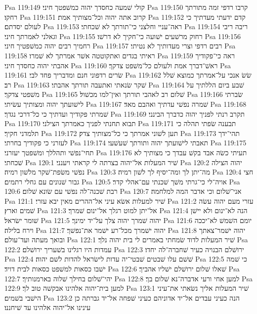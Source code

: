 Psa 119:149  קולי שׁמעה כחסדך יהוה כמשׁפטך חיני׃
Psa 119:150  קרבו רדפי זמה מתורתך רחקו׃
Psa 119:151  קרוב אתה יהוה וכל־מצותיך אמת׃
Psa 119:152  קדם ידעתי מעדתיך כי לעולם יסדתם׃
Psa 119:153  ראה־עניי וחלצני כי־תורתך לא שׁכחתי׃
Psa 119:154  ריבה ריבי וגאלני לאמרתך חיני׃
Psa 119:155  רחוק מרשׁעים ישׁועה כי־חקיך לא דרשׁו׃
Psa 119:156  רחמיך רבים יהוה כמשׁפטיך חיני׃
Psa 119:157  רבים רדפי וצרי מעדותיך לא נטיתי׃
Psa 119:158  ראיתי בגדים ואתקוטטה אשׁר אמרתך לא שׁמרו׃
Psa 119:159  ראה כי־פקודיך אהבתי יהוה כחסדך חיני׃
Psa 119:160  ראשׁ־דברך אמת ולעולם כל־משׁפט צדקך׃
Psa 119:161  שׂרים רדפוני חנם ומדבריך פחד לבי׃
Psa 119:162  שׂשׂ אנכי על־אמרתך כמוצא שׁלל רב׃
Psa 119:163  שׁקר שׂנאתי ואתעבה תורתך אהבתי׃
Psa 119:164  שׁבע ביום הללתיך על משׁפטי צדקך׃
Psa 119:165  שׁלום רב לאהבי תורתך ואין־למו מכשׁול׃
Psa 119:166  שׂברתי לישׁועתך יהוה ומצותיך עשׂיתי׃
Psa 119:167  שׁמרה נפשׁי עדתיך ואהבם מאד׃
Psa 119:168  שׁמרתי פקודיך ועדתיך כי כל־דרכי נגדך׃
Psa 119:169  תקרב רנתי לפניך יהוה כדברך הבינני׃
Psa 119:170  תבוא תחנתי לפניך כאמרתך הצילני׃
Psa 119:171  תבענה שׂפתי תהלה כי תלמדני חקיך׃
Psa 119:172  תען לשׁוני אמרתך כי כל־מצותיך צדק׃
Psa 119:173  תהי־ידך לעזרני כי פקודיך בחרתי׃
Psa 119:174  תאבתי לישׁועתך יהוה ותורתך שׁעשׁעי׃
Psa 119:175  תחי־נפשׁי ותהללך ומשׁפטך יעזרני׃
Psa 119:176  תעיתי כשׂה אבד בקשׁ עבדך כי מצותיך לא שׁכחתי׃
Psa 120:1  שׁיר המעלות אל־יהוה בצרתה לי קראתי ויענני׃
Psa 120:2  יהוה הצילה נפשׁי משׂפת־שׁקר מלשׁון רמיה׃
Psa 120:3  מה־יתן לך ומה־יסיף לך לשׁון רמיה׃
Psa 120:4  חצי גבור שׁנונים עם גחלי רתמים׃
Psa 120:5  אויה־לי כי־גרתי משׁך שׁכנתי עם־אהלי קדר׃
Psa 120:6  רבת שׁכנה־לה נפשׁי עם שׂונא שׁלום׃
Psa 120:7  אני־שׁלום וכי אדבר המה למלחמה׃
Psa 121:1  שׁיר למעלות אשׂא עיני אל־ההרים מאין יבא עזרי׃
Psa 121:2  עזרי מעם יהוה עשׂה שׁמים וארץ׃
Psa 121:3  אל־יתן למוט רגלך אל־ינום שׁמרך׃
Psa 121:4  הנה לא־ינום ולא יישׁן שׁומר ישׂראל׃
Psa 121:5  יהוה שׁמרך יהוה צלך על־יד ימינך׃
Psa 121:6  יומם השׁמשׁ לא־יככה וירח בלילה׃
Psa 121:7  יהוה ישׁמרך מכל־רע ישׁמר את־נפשׁך׃
Psa 121:8  יהוה ישׁמר־צאתך ובואך מעתה ועד־עולם׃
Psa 122:1  שׁיר המעלות לדוד שׂמחתי באמרים לי בית יהוה נלך׃
Psa 122:2  עמדות היו רגלינו בשׁעריך ירושׁלם׃
Psa 122:3  ירושׁלם הבנויה כעיר שׁחברה־לה יחדו׃
Psa 122:4  שׁשׁם עלו שׁבטים שׁבטי־יה עדות לישׂראל להדות לשׁם יהוה׃
Psa 122:5  כי שׁמה ישׁבו כסאות למשׁפט כסאות לבית דויד׃
Psa 122:6  שׁאלו שׁלום ירושׁלם ישׁליו אהביך׃
Psa 122:7  יהי־שׁלום בחילך שׁלוה בארמנותיך׃
Psa 122:8  למען אחי ורעי אדברה־נא שׁלום בך׃
Psa 122:9  למען בית־יהוה אלהינו אבקשׁה טוב לך׃
Psa 123:1  שׁיר המעלות אליך נשׂאתי את־עיני הישׁבי בשׁמים׃
Psa 123:2  הנה כעיני עבדים אל־יד אדוניהם כעיני שׁפחה אל־יד גברתה כן עינינו אל־יהוה אלהינו עד שׁיחננו׃
